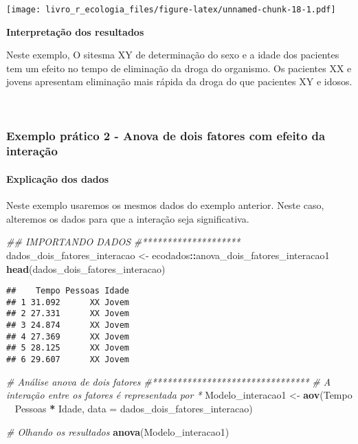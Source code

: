 \documentclass[
]{book}
\newenvironment{Shaded}{\begin{snugshade}}{\end{snugshade}}
\newcommand{\CommentTok}[1]{\textcolor[rgb]{0.56,0.35,0.01}{\textit{#1}}}
\newcommand{\DataTypeTok}[1]{\textcolor[rgb]{0.13,0.29,0.53}{#1}}
\newcommand{\KeywordTok}[1]{\textcolor[rgb]{0.13,0.29,0.53}{\textbf{#1}}}
\newcommand{\NormalTok}[1]{#1}
\newcommand{\OperatorTok}[1]{\textcolor[rgb]{0.81,0.36,0.00}{\textbf{#1}}}
\newcommand{\StringTok}[1]{\textcolor[rgb]{0.31,0.60,0.02}{#1}}
\begin{document}
\texttt{[image: livro\_r\_ecologia\_files/figure-latex/unnamed-chunk-18-1.pdf]}

\textbf{Interpretação dos resultados}

Neste exemplo, O sitesma XY de determinação do sexo e a idade dos pacientes tem um efeito no tempo de eliminação da droga do organismo. Os pacientes XX e jovens apresentam eliminação mais rápida da droga do que pacientes XY e idosos.

~

\hypertarget{exemplo-pruxe1tico-2---anova-de-dois-fatores-com-efeito-da-interauxe7uxe3o}{%
\subsubsection{Exemplo prático 2 - Anova de dois fatores com efeito da interação}\label{exemplo-pruxe1tico-2---anova-de-dois-fatores-com-efeito-da-interauxe7uxe3o}}

\hypertarget{explicauxe7uxe3o-dos-dados-8}{%
\paragraph{Explicação dos dados}\label{explicauxe7uxe3o-dos-dados-8}}

Neste exemplo usaremos os mesmos dados do exemplo anterior. Neste caso, alteremos os dados para que a interação seja significativa.

\begin{Shaded}
\begin{Highlighting}[]
\CommentTok{## IMPORTANDO DADOS}
\CommentTok{#********************}
\NormalTok{dados_dois_fatores_interacao <-}\StringTok{ }\NormalTok{ecodados}\OperatorTok{::}\NormalTok{anova_dois_fatores_interacao1}
\KeywordTok{head}\NormalTok{(dados_dois_fatores_interacao)}
\end{Highlighting}
\end{Shaded}

\begin{verbatim}
##    Tempo Pessoas Idade
## 1 31.092      XX Jovem
## 2 27.331      XX Jovem
## 3 24.874      XX Jovem
## 4 27.369      XX Jovem
## 5 28.125      XX Jovem
## 6 29.607      XX Jovem
\end{verbatim}

\begin{Shaded}
\begin{Highlighting}[]
\CommentTok{# Análise anova de dois fatores }
\CommentTok{#********************************}
\CommentTok{# A interação entre os fatores é representada por *}
\NormalTok{Modelo_interacao1 <-}\StringTok{ }\KeywordTok{aov}\NormalTok{(Tempo }\OperatorTok{~}\StringTok{ }\NormalTok{Pessoas }\OperatorTok{*}\StringTok{ }\NormalTok{Idade, }\DataTypeTok{data =}\NormalTok{ dados_dois_fatores_interacao) }

\CommentTok{# Olhando os resultados}
\KeywordTok{anova}\NormalTok{(Modelo_interacao1)}
\end{Highlighting}
\end{Shaded}
\end{document}
